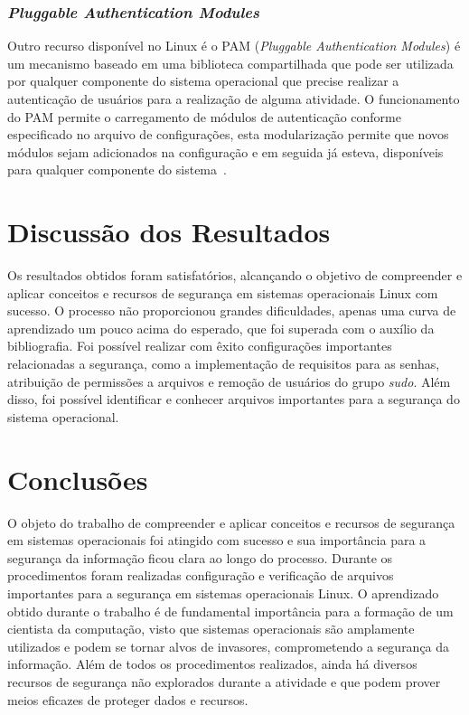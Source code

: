 \documentclass[
	12pt,				%
	oneside,   	        %
	a4paper,			%
	english,			%
	french,				%
	spanish,			%
	brazil,				%
	]{pacotes/abntex2}
\begin{document}
\subsubsection{\textit{Pluggable Authentication Modules}}
Outro recurso disponível no Linux é o PAM (\textit{Pluggable Authentication Modules}) é um mecanismo baseado em uma biblioteca compartilhada que pode ser utilizada por qualquer componente do sistema operacional que precise realizar a autenticação de usuários para a realização de alguma atividade. O funcionamento do PAM permite o carregamento de módulos de autenticação conforme especificado no arquivo de configurações, esta modularização permite que novos módulos sejam adicionados na configuração e em seguida já esteva, disponíveis para qualquer componente do sistema~\cite{silberschatz2015}.

\section{Discussão dos Resultados}
\label{sec:discussao}

Os resultados obtidos foram satisfatórios, alcançando o objetivo de compreender e aplicar conceitos e recursos de segurança em sistemas operacionais Linux com sucesso. O processo não proporcionou grandes dificuldades, apenas uma curva de aprendizado um pouco acima do esperado, que foi superada com o auxílio da bibliografia. Foi possível realizar com êxito configurações importantes relacionadas a segurança, como a implementação de requisitos para as senhas, atribuição de permissões a arquivos e remoção de usuários do grupo \textit{sudo}. Além disso, foi possível identificar e conhecer arquivos importantes para a segurança do sistema operacional.

\section{Conclusões}
\label{sec:conclusoes}

O objeto do trabalho de compreender e aplicar conceitos e recursos de segurança em sistemas operacionais foi atingido com sucesso e sua importância para a segurança da informação ficou clara ao longo do processo. Durante os procedimentos foram realizadas configuração e verificação de arquivos importantes para a segurança em sistemas operacionais Linux. O aprendizado obtido durante o trabalho é de fundamental importância para a formação de um cientista da computação, visto que sistemas operacionais são amplamente utilizados e podem se tornar alvos de invasores, comprometendo a segurança da informação. Além de todos os procedimentos realizados, ainda há diversos recursos de segurança não explorados durante a atividade e que podem prover meios eficazes de proteger dados e recursos.
\end{document}
